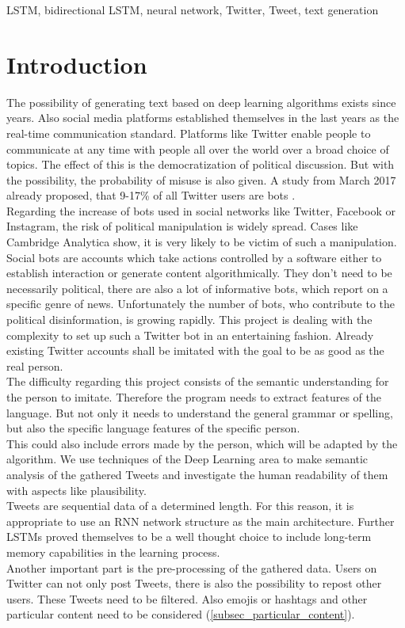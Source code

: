 \documentclass[hidelinks, conference]{IEEEtran}
\begin{document}
\begin{IEEEkeywords}
LSTM, bidirectional LSTM, neural network, Twitter, Tweet, text generation
\end{IEEEkeywords}

\section{Introduction}

The possibility of generating text based on deep learning algorithms exists since years. Also social media platforms established themselves in the last years as the real-time communication standard. Platforms like Twitter enable people to communicate at any time with people all over the world over a broad choice of topics. The effect of this is the democratization of political discussion. But with the possibility, the probability of misuse is also given. A study from March 2017 already proposed, that 9-17\% of all Twitter users are bots \cite{tim1}.\\
Regarding the increase of bots used in social networks like Twitter, Facebook or Instagram, the risk of political manipulation is widely spread. Cases like Cambridge Analytica show, it is very likely to be victim of such a manipulation.\\
Social bots are accounts which take actions controlled by a software either to establish interaction or generate content algorithmically. They don’t need to be necessarily political, there are also a lot of informative bots, which report on a specific genre of news. Unfortunately the number of bots, who contribute to the political disinformation, is growing rapidly. This project is dealing with the complexity to set up such a Twitter bot in an entertaining fashion. Already existing Twitter accounts shall be imitated with the goal to be as good as the real person.\\
The difficulty regarding this project consists of the semantic understanding for the person to imitate. Therefore the program needs to extract features of the language. But not only it needs to understand the general grammar or spelling, but also the specific language features of the specific person.\\
This could also include errors made by the person, which will be adapted by the algorithm. We use techniques of the Deep Learning area to make semantic analysis of the gathered Tweets and investigate the human readability of them with aspects like plausibility.\\
Tweets are sequential data of a determined length. For this reason, it is appropriate to use an RNN network structure as the main architecture. Further LSTMs proved themselves to be a well thought choice to include long-term memory capabilities in the learning process.\\
Another important part is the pre-processing of the gathered data. Users on Twitter can not only post Tweets, there is also the possibility to repost other users. These Tweets need to be filtered. Also emojis or hashtags and other particular content need to be considered (\ref{subsec_particular_content}).\\
\end{document}
